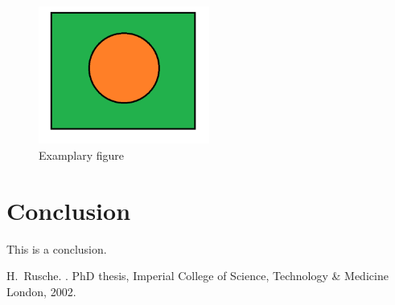 \documentclass[e-only,10pt,reqno]{ofj}
\numberwithin{equation}{section}
\begin{document}
\begin{figure}
\includegraphics[width=0.5\textwidth]{example.png}
\caption{Examplary figure}
\label{fig:example}
\end{figure}


\section{Conclusion}

This is a conclusion.


\begin{thebibliography}{1}

H.~Rusche.
.
\newblock PhD thesis, {Imperial College of Science, Technology \& Medicine
  London}, 2002.

\end{thebibliography}
\end{document}
